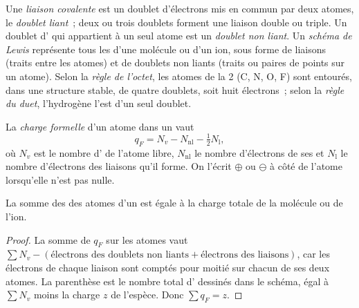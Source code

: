 \begin{definition}\label{def:b1:lewis-resonance-vsepr:lewis}
Une \emph{liaison covalente} est un doublet d'électrons mis en
commun par deux atomes, le \emph{doublet liant}~; deux ou trois doublets
forment une liaison double ou triple. Un doublet d'
qui appartient à un seul atome est un \emph{doublet non liant}. Un
\emph{schéma de Lewis} représente tous les 
d'une molécule ou d'un ion, sous forme de liaisons (traits entre les
atomes) et de doublets non liants (traits ou paires de points sur un
atome). Selon la \emph{règle de
l'octet}, les atomes de la  2 (C, N, O, F) sont
entourés, dans une structure stable, de quatre doublets, soit huit
électrons~; selon la \emph{règle du duet}, l'hydrogène l'est d'un
seul doublet.
\end{definition}

\begin{definition}\label{def:b1:lewis-resonance-vsepr:formal-charge}
La \emph{charge formelle} d'un atome dans un 
vaut
\[
  q_F = N_v - N_{\text{nl}} - \tfrac12 N_{\text{l}},
\]
où $N_v$ est le nombre d' de l'atome libre,
$N_{\text{nl}}$ le nombre d'électrons de ses  et
$N_{\text{l}}$ le nombre d'électrons des liaisons qu'il forme. On
l'écrit $\oplus$ ou $\ominus$ à côté de l'atome lorsqu'elle n'est pas nulle.
\end{definition}

\begin{proposition}\label{prop:b1:lewis-resonance-vsepr:formal-sum}
La somme des  des atomes d'un  est égale
à la charge totale de la molécule ou de l'ion.
\end{proposition}

\begin{proof}
La somme de $q_F$ sur les atomes vaut $\sum N_v - (\text{électrons des
doublets non liants} + \text{électrons des liaisons})$, car les électrons
de chaque liaison sont comptés pour moitié sur chacun de ses deux atomes.
La parenthèse est le nombre total d' dessinés dans le
schéma, égal à $\sum N_v$ moins la charge $z$ de l'espèce. Donc
$\sum q_F = z$.
\end{proof}

